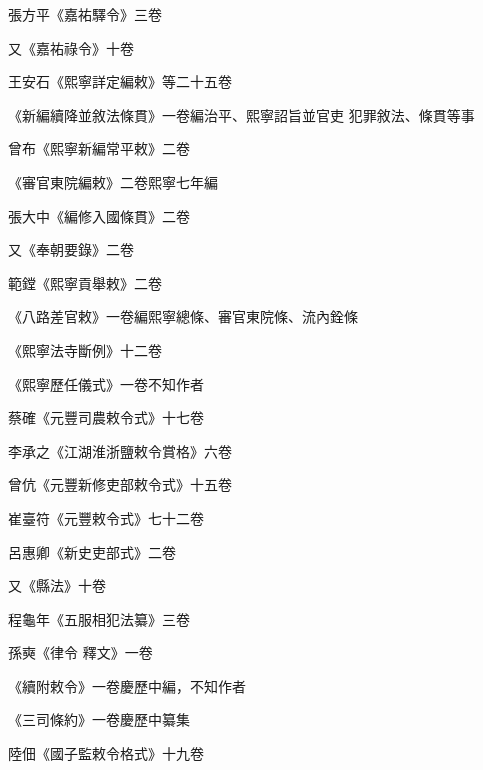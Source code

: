 \begin{pinyinscope}
 張方平《嘉祐驛令》三卷



 又《嘉祐祿令》十卷



 王安石《熙寧詳定編敕》等二十五卷



 《新編續降並敘法條貫》一卷編治平、熙寧詔旨並官吏
 犯罪敘法、條貫等事



 曾布《熙寧新編常平敕》二卷



 《審官東院編敕》二卷熙寧七年編



 張大中《編修入國條貫》二卷



 又《奉朝要錄》二卷



 範鏜《熙寧貢舉敕》二卷



 《八路差官敕》一卷編熙寧總條、審官東院條、流內銓條



 《熙寧法寺斷例》十二卷



 《熙寧歷任儀式》一卷不知作者



 蔡確《元豐司農敕令式》十七卷



 李承之《江湖淮浙鹽敕令賞格》六卷



 曾伉《元豐新修吏部敕令式》十五卷



 崔臺符《元豐敕令式》七十二卷



 呂惠卿《新史吏部式》二卷



 又《縣法》十卷



 程龜年《五服相犯法纂》三卷



 孫奭《律令
 釋文》一卷



 《續附敕令》一卷慶歷中編，不知作者



 《三司條約》一卷慶歷中纂集



 陸佃《國子監敕令格式》十九卷




\end{pinyinscope}
